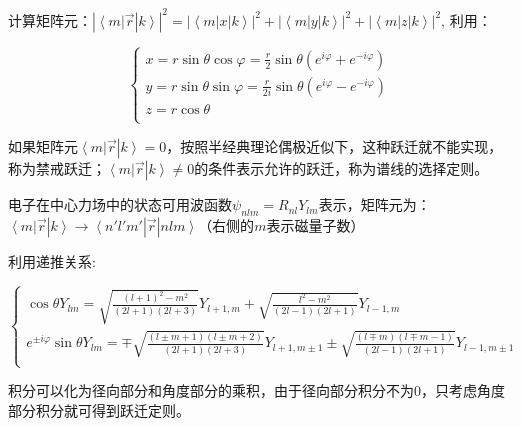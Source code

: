 
计算矩阵元：$| \left\langle m \right|\left. {\vec r} \right|\left. k
\right\rangle |^2  = | \left\langle m \right|\left. x \right|\left.
k \right\rangle |^2  + | \left\langle m \right|\left. y
\right|\left. k \right\rangle |^2  + | \left\langle m \right|\left.
z \right|\left. k \right\rangle |^2 $, 利用：

\begin{equation}\label{25-10}
\left\{ \begin{array}{l}
 x = r\sin \theta \cos \varphi  = \frac{r}{2}\sin \theta \left( {e^{i\varphi }  + e^{ - i\varphi } } \right) \\
 y = r\sin \theta \sin \varphi  = \frac{r}{{2i}}\sin \theta \left( {e^{i\varphi }  - e^{ - i\varphi } } \right) \\
 z = r\cos \theta  \\
 \end{array} \right.
\end{equation}

如果矩阵元$\left\langle m \right|\left. {\vec r} \right|\left. k
\right\rangle  =
0$，按照半经典理论偶极近似下，这种跃迁就不能实现，称为禁戒跃迁；$\left\langle
m \right|\left. {\vec r} \right|\left. k \right\rangle  \ne
0$的条件表示允许的跃迁，称为谱线的选择定则。


电子在中心力场中的状态可用波函数$\psi _{nlm}  = R_{nl} Y_{lm}
$表示，矩阵元为：$\left\langle m \right|\left. {\vec r}
\right|\left. k \right\rangle  \to \left\langle {n'l'm'}
\right.\left| {\vec r} \right|\left. {nlm} \right\rangle
$（右侧的$m$表示磁量子数）

利用递推关系:

\begin{equation}\label{25-11}
\left\{ \begin{array}{l}
 \cos \theta Y_{lm}  = \sqrt {\frac{{(l + 1)^2  - m^2 }}{{(2l + 1)(2l + 3)}}} Y_{l + 1,m}  + \sqrt {\frac{{l^2  - m^2 }}{{(2l - 1)(2l + 1)}}} Y_{l - 1,m}  \\
 e^{ \pm i\varphi } \sin \theta Y_{lm}  =  \mp \sqrt {\frac{{(l \pm m + 1)(l \pm m + 2)}}{{(2l + 1)(2l + 3)}}} Y_{l + 1,m \pm 1}  \pm \sqrt {\frac{{(l \mp m)(l \mp m - 1)}}{{(2l - 1)(2l + 1)}}} Y_{l - 1,m \pm 1}  \\
 \end{array} \right.
\end{equation}


积分可以化为径向部分和角度部分的乘积，由于径向部分积分不为0，只考虑角度部分积分就可得到跃迁定则。


